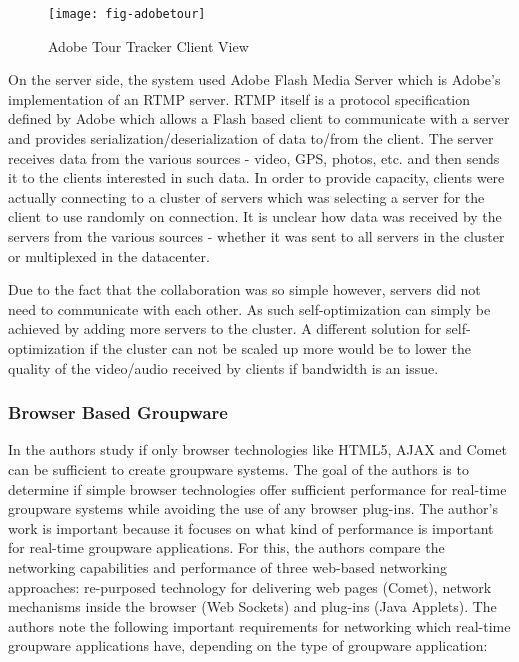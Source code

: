 \begin{figure}
	\centering
	\texttt{[image: fig-adobetour]}
	\caption{Adobe Tour Tracker Client View}
	\label{fig:adobetour}
\end{figure}

On the server side, the system used Adobe Flash Media Server which is Adobe's implementation of an RTMP server. RTMP itself is a protocol specification defined by Adobe which allows a Flash based client to communicate with a server and provides serialization/deserialization of data to/from the client. The server receives data from the various sources - video, GPS, photos, etc. and then sends it to the clients interested in such data. In order to provide capacity, clients were actually connecting to a cluster of servers which was selecting a server for the client to use randomly on connection. It is unclear how data was received by the servers from the various sources - whether it was sent to all servers in the cluster or multiplexed in the datacenter.

Due to the fact that the collaboration was so simple however, servers did not need to communicate with each other. As such self-optimization can simply be achieved by adding more servers to the cluster. A different solution for self-optimization if the cluster can not be scaled up more would be to lower the quality of the video/audio received by clients if bandwidth is an issue.

\subsubsection{Browser Based Groupware}

In \cite{related:colab1} the authors study if only browser technologies like HTML5, AJAX and Comet can be sufficient to create groupware systems. The goal of the authors is to determine if simple browser technologies offer sufficient performance for real-time groupware systems while avoiding the use of any browser plug-ins. The author's work is important because it focuses on what kind of performance is important for real-time groupware applications. For this, the authors compare the networking capabilities and performance of three web-based networking approaches: re-purposed technology for delivering web pages (Comet), network mechanisms inside the browser (Web Sockets) and plug-ins (Java Applets). The authors note the following important requirements for networking which real-time groupware applications have, depending on the type of groupware application:

